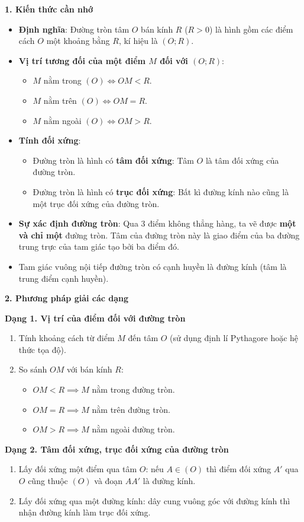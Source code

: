 \textbf{1. Kiến thức cần nhớ}
\begin{itemize}
\item \textbf{Định nghĩa}: Đường tròn tâm $O$ bán kính $R$ ($R > 0$) là hình gồm các điểm cách $O$ một khoảng bằng $R$, kí hiệu là $(O; R)$.
\item \textbf{Vị trí tương đối của một điểm $M$ đối với $(O; R)$}:
\begin{itemize}
\item $M$ nằm trong $(O) \iff OM < R$.
\item $M$ nằm trên $(O) \iff OM = R$.
\item $M$ nằm ngoài $(O) \iff OM > R$.
\end{itemize}
\item \textbf{Tính đối xứng}:
\begin{itemize}
\item Đường tròn là hình có \textbf{tâm đối xứng}: Tâm $O$ là tâm đối xứng của đường tròn.
\item Đường tròn là hình có \textbf{trục đối xứng}: Bất kì đường kính nào cũng là một trục đối xứng của đường tròn.
\end{itemize}
\item \textbf{Sự xác định đường tròn}: Qua $3$ điểm không thẳng hàng, ta vẽ được \textbf{một và chỉ một} đường tròn. Tâm của đường tròn này là giao điểm của ba đường trung trực của tam giác tạo bởi ba điểm đó.
\item Tam giác vuông nội tiếp đường tròn có cạnh huyền là đường kính (tâm là trung điểm cạnh huyền).
\end{itemize}

\textbf{2. Phương pháp giải các dạng}

\textbf{Dạng 1. Vị trí của điểm đối với đường tròn}
\begin{enumerate}
\item Tính khoảng cách từ điểm $M$ đến tâm $O$ (sử dụng định lí Pythagore hoặc hệ thức tọa độ).
\item So sánh $OM$ với bán kính $R$:
\begin{itemize}
\item $OM < R \implies M$ nằm trong đường tròn.
\item $OM = R \implies M$ nằm trên đường tròn.
\item $OM > R \implies M$ nằm ngoài đường tròn.
\end{itemize}
\end{enumerate}

\textbf{Dạng 2. Tâm đối xứng, trục đối xứng của đường tròn}
\begin{enumerate}
\item Lấy đối xứng một điểm qua tâm $O$: nếu $A \in (O)$ thì điểm đối xứng $A'$ qua $O$ cũng thuộc $(O)$ và đoạn $AA'$ là đường kính.
\item Lấy đối xứng qua một đường kính: dây cung vuông góc với đường kính thì nhận đường kính làm trục đối xứng.
\end{enumerate}

